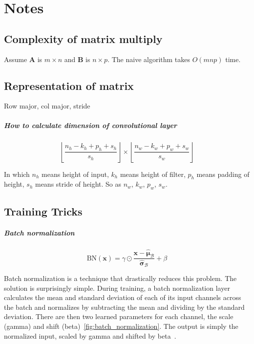 \chapter{Notes}\label{chap:Notes}

\section{Complexity of matrix multiply}\label{sec:Complexity of matrix multiply}

Assume $\mathbf{A}$ is $m\times n$ and $\mathbf{B}$ is $n\times p$.
The naive algorithm takes $O\left(mnp\right)$ time.


\section{Representation of matrix}\label{sec:Representation of matrix}

Row major, col major, stride


\paragraph{How to calculate dimension of convolutional layer}

\[ \left\lfloor \frac{n_h - k_h + p_h + s_h}{s_h} \right\rfloor \times \left\lfloor \frac{n_w - k_w + p_w + s_w}{s_w} \right\rfloor \]

In which  \(n_h\)  means height of input, \(k_h\) means height of filter, \(p_h\) means padding of height, \(s_h\) means stride of height. So as \(n_w\), \(k_w\), \(p_w\), \(s_w\).


\section{Training Tricks}\label{sec:Training Tricks}


\paragraph{Batch normalization}

\[
	\textrm{BN}\left(\bm{x}\right)  = \gamma  \odot \frac{\bm{x} - \hat{\bm \mu}_\mathcal{B}}{\hat{\bm \sigma}_\mathcal{B}} + \beta
\]

Batch normalization is a technique that drastically reduces this problem.
The solution is surprisingly simple.
During training, a batch normalization layer calculates the mean and standard deviation of each of its input channels across the batch and normalizes by subtracting the mean and dividing by the standard deviation.
There are then two learned parameters for each channel, the scale (gamma) and shift (beta)~\cref{fig:batch_normalization}.
The output is simply the normalized input, scaled by gamma and shifted by beta~\cite{foster2022generative}.



